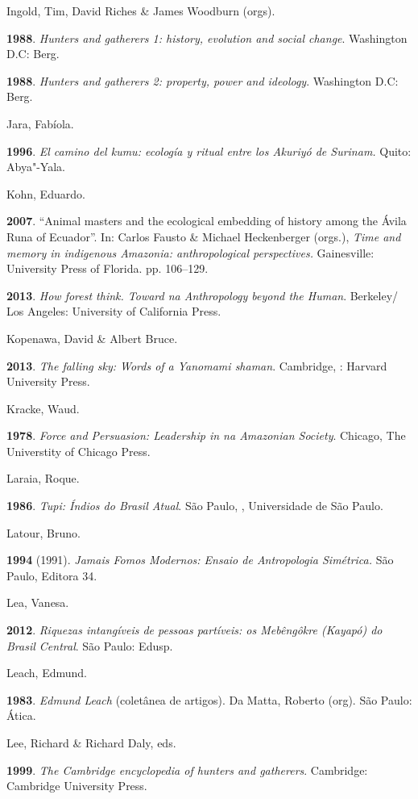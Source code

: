 Ingold, Tim, David Riches \& James Woodburn (orgs).

\textbf{1988}. \emph{Hunters and gatherers 1: history, evolution and
social change}. Washington D.C: Berg.

\textbf{1988}. \emph{Hunters and gatherers 2: property, power and
ideology}. Washington D.C: Berg.

Jara, Fabíola.

\textbf{1996}. \emph{El camino del kumu: ecología y ritual entre los
Akuriyó de Surinam.} Quito: Abya"-Yala.

Kohn, Eduardo.

\textbf{2007}. ``Animal masters and the ecological embedding of history
among the Ávila Runa of Ecuador''. In: Carlos Fausto \& Michael
Heckenberger (orgs.), \emph{Time and memory in indigenous Amazonia:
anthropological perspectives.} Gainesville: University Press of Florida.
pp. 106--129.

\textbf{2013}. \emph{How forest think. Toward na Anthropology beyond the
Human}. Berkeley/ Los Angeles: University of California Press.

Kopenawa, David \& Albert Bruce.

\textbf{2013}. \emph{The falling sky: Words of a Yanomami shaman}.
Cambridge, : Harvard University Press.

Kracke, Waud.

\textbf{1978}. \emph{Force and Persuasion: Leadership in na Amazonian
Society}. Chicago, The Universtity of Chicago Press.

Laraia, Roque.

\textbf{1986}. \emph{Tupi: Índios do Brasil Atual}. São Paulo, ,
Universidade de São Paulo.

Latour, Bruno.

\textbf{1994} (1991). \emph{Jamais Fomos Modernos: Ensaio de
Antropologia Simétrica.} São Paulo, Editora 34.

Lea, Vanesa.

\textbf{2012}. \emph{Riquezas intangíveis de pessoas partíveis: os
Mebêngôkre (Kayapó) do Brasil Central}. São Paulo: Edusp.

Leach, Edmund.

\textbf{1983}. \emph{Edmund Leach} (coletânea de artigos). Da Matta,
Roberto (org). São Paulo: Ática.

Lee, Richard \& Richard Daly, eds.

\textbf{1999}. \emph{The Cambridge encyclopedia of hunters and
gatherers}. Cambridge: Cambridge University Press.

